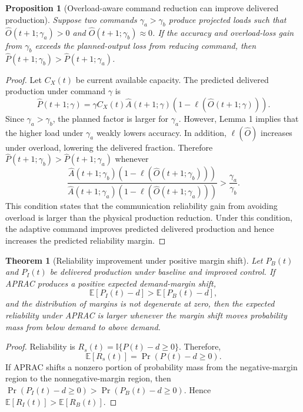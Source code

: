 \documentclass[journal]{IEEEtran}
\newtheorem{theorem}{Theorem}
\newtheorem{proposition}{Proposition}
\begin{document}
\begin{proposition}[Overload-aware command reduction can improve delivered production]
Suppose two commands $\gamma_a>\gamma_b$ produce projected loads such that $\widehat{O}(t+1;\gamma_a)>0$ and $\widehat{O}(t+1;\gamma_b)\approx0$. If the accuracy and overload-loss gain from $\gamma_b$ exceeds the planned-output loss from reducing command, then $\widehat{P}(t+1;\gamma_b)>\widehat{P}(t+1;\gamma_a)$.
\end{proposition}

\begin{proof}
Let $C_X(t)$ be current available capacity. The predicted delivered production under command $\gamma$ is
\begin{equation}
\widehat{P}(t+1;\gamma)=\gamma C_X(t)\widehat{A}(t+1;\gamma)(1-\ell(\widehat{O}(t+1;\gamma))).
\end{equation}
Since $\gamma_a>\gamma_b$, the planned factor is larger for $\gamma_a$. However, Lemma 1 implies that the higher load under $\gamma_a$ weakly lowers accuracy. In addition, $\ell(\widehat{O})$ increases under overload, lowering the delivered fraction. Therefore $\widehat{P}(t+1;\gamma_b)>\widehat{P}(t+1;\gamma_a)$ whenever
\begin{equation}
\frac{\widehat{A}(t+1;\gamma_b)(1-\ell(\widehat{O}(t+1;\gamma_b)))}
{\widehat{A}(t+1;\gamma_a)(1-\ell(\widehat{O}(t+1;\gamma_a)))}
>
\frac{\gamma_a}{\gamma_b}.
\end{equation}
This condition states that the communication reliability gain from avoiding overload is larger than the physical production reduction. Under this condition, the adaptive command improves predicted delivered production and hence increases the predicted reliability margin.
\end{proof}

\begin{theorem}[Reliability improvement under positive margin shift]
Let $P_B(t)$ and $P_I(t)$ be delivered production under baseline and improved control. If APRAC produces a positive expected demand-margin shift,
\begin{equation}
\mathbb{E}[P_I(t)-d]>\mathbb{E}[P_B(t)-d],
\end{equation}
and the distribution of margins is not degenerate at zero, then the expected reliability under APRAC is larger whenever the margin shift moves probability mass from below demand to above demand.
\end{theorem}

\begin{proof}
Reliability is $R_s(t)=\mathbb{I}\{P(t)-d\ge0\}$. Therefore,
\begin{equation}
\mathbb{E}[R_s(t)]=\Pr(P(t)-d\ge0).
\end{equation}
If APRAC shifts a nonzero portion of probability mass from the negative-margin region to the nonnegative-margin region, then $\Pr(P_I(t)-d\ge0)>\Pr(P_B(t)-d\ge0)$. Hence $\mathbb{E}[R_I(t)]>\mathbb{E}[R_B(t)]$.
\end{proof}
\end{document}

